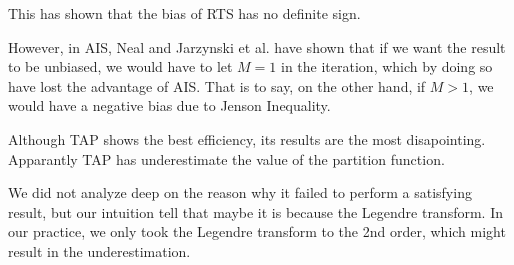 This has shown that the bias of RTS has no definite sign.

However, in AIS, Neal and Jarzynski et al.\cite{neal2001annealed,nonequilibrium} have shown that if we want the result to be unbiased, we would have to let $M=1$ in the iteration, which by doing so have lost the advantage of AIS. That is to say, on the other hand, if $M > 1$, we would have a negative bias due to Jenson Inequality.




Although TAP shows the best efficiency, its results are the most disapointing. Apparantly TAP has underestimate the value of the partition function.

We did not analyze deep on the reason why it failed to perform a satisfying result, but our intuition tell that maybe it is because the Legendre transform. In our practice, we only took the Legendre transform to the 2nd order, which might result in the underestimation.
